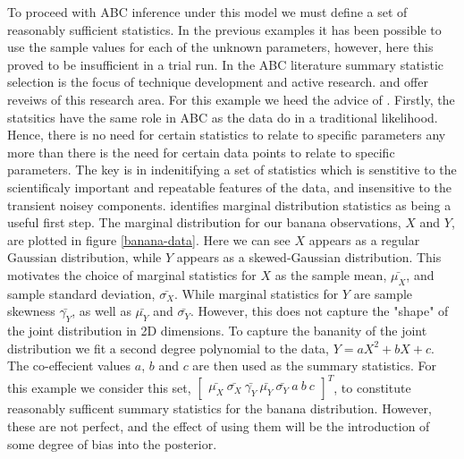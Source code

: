 To proceed with ABC inference under this model we must define a set of reasonably sufficient statistics. In the previous examples it has been possible to use the sample values for each of the unknown parameters, however, here this proved to be insufficient in a trial run. In the ABC literature summary statistic selection is the focus of technique development and active research. \citet{Blum2013} and \citet{Prangle2017} offer reveiws of this research area. For this example we heed the advice of \citet{Wood2010}. Firstly, the statsitics have the same role in ABC as the data do in a traditional likelihood. Hence, there is no need for certain statistics to relate to specific parameters any more than there is the need for certain data points to relate to specific parameters. The key is in indenitifying a set of statistics which is senstitive to the scientificaly important and repeatable features of the data, and insensitive to the transient noisey components. \citet{Wood2010} identifies marginal distribution statistics as being a useful first step. The marginal distribution for our banana observations, $X$ and $Y$, are plotted in figure \ref{banana-data}. Here we can see $X$ appears as a regular Gaussian distribution, while $Y$ appears as a skewed-Gaussian distribution. This motivates the choice of marginal statistics for $X$ as the sample mean, $\bar{\mu_X}$, and sample standard deviation, $\bar{\sigma_X}$. While marginal statistics for $Y$ are sample skewness $\bar{\gamma_Y}$, as well as $\bar{\mu_Y}$ and $\bar{\sigma_Y}$. However, this does not capture the "shape" of the joint distribution in 2D dimensions. To capture the bananity of the joint distribution we fit a second degree polynomial to the data, $Y = aX^2 + bX + c$. The co-effecient values $a$, $b$ and $c$ are then used as the summary statistics. For this example we consider this set, $\begin{bmatrix}
\bar{\mu_X}\ \bar{\sigma_X}\ \bar{\gamma_Y}\ \bar{\mu_Y}\ \bar{\sigma_Y}\ a\ b\ c
\end{bmatrix}^T$, to constitute reasonably sufficent summary statistics for the banana distribution. However, these are not perfect, and the effect of using them will be the introduction of some degree of bias into the posterior. \\



